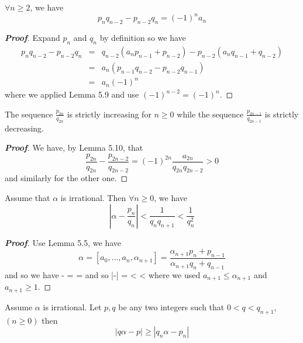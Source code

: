 \begin{lemma} $\forall n \ge 2$, we have
$$p_n q_{n-2}-p_{n-2}q_n = (-1)^n a_n$$
\end{lemma}
\begin{proof}[\bf Proof] Expand $p_n$ and $q_n$ by definition so we have
\begin{eqnarray*}
p_n q_{n-2}-p_{n-2}q_n &= &q_{n-2}(a_n p_{n-1} +p_{n-2})-p_{n-2}(a_n q_{n-1}+q_{n-2})\\
&=&a_n (p_{n-1}q_{n-2}-p_{n-2}q_{n-1})\\
&=&a_n(-1)^{n}
\end{eqnarray*}
where we applied Lemma 5.9 and use $(-1)^{n-2}=(-1)^n$.
\end{proof}
\begin{lemma} The sequence $\frac{p_{2n}}{q_{2n}}$ is strictly increasing for $n \ge 0$ while the sequence $\frac{p_{2n-1}}{q_{2n-1}}$ is strictly decreasing.
\end{lemma}
\begin{proof}[\bf Proof] We have, by Lemma 5.10, that
$$\frac{p_{2n}}{q_{2n}}-\frac{p_{2n-2}}{q_{2n-2}}=(-1)^{2n} \frac{a_{2n}}{q_{2n}q_{2n-2}} >0$$
and similarly for the other one.
\end{proof}
\begin{theorem} Assume that $\alpha$ is irrational. Then $\forall n \ge 0$, we have
$$\left|\alpha-\frac{p_n}{q_n}\right|<\frac{1}{q_n q_{n+1}} < \frac{1}{q^2_n}$$
\end{theorem}
\begin{proof}[\bf Proof] Use Lemma 5.5, we have
$$\alpha=[a_0,\ldots, a_n,\alpha_{n+1}]=\frac{\alpha_{n+1}p_n+p_{n-1}}{\alpha_{n+1}q_n+q_{n-1}}$$
and so we have
\be
\alpha- =  = 
\ee
and so
\be
\left|\alpha-\right| = <  \le {} < 
\ee
where we used $a_{n+1} \le \alpha_{n+1}$ and $a_{n+1} \ge 1$.
\end{proof}
\begin{theorem} Assume $\alpha$ is irrational. Let $p,q$ be any two integers such that
$0<q<q_{n+1}$,  $(n \ge 0)$ then
$$\left|q\alpha-p\right| \ge \left|q_n \alpha -p_n\right|$$
\end{theorem}

